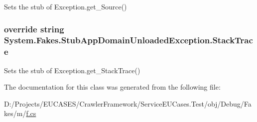 Sets the stub of Exception.\-get\-\_\-\-Source()

\hypertarget{class_system_1_1_fakes_1_1_stub_app_domain_unloaded_exception_a957181d4e271189f788d93b437ef12b4}{
\subsubsection[{Stack\-Trace}]{\setlength{\rightskip}{0pt plus 5cm}override string System.\-Fakes.\-Stub\-App\-Domain\-Unloaded\-Exception.\-Stack\-Trace\hspace{0.3cm}{\ttfamily [get]}}}\label{class_system_1_1_fakes_1_1_stub_app_domain_unloaded_exception_a957181d4e271189f788d93b437ef12b4}


Sets the stub of Exception.\-get\-\_\-\-Stack\-Trace()



The documentation for this class was generated from the following file\-:\begin{DoxyCompactItemize}
\item 
D\-:/\-Projects/\-E\-U\-C\-A\-S\-E\-S/\-Crawler\-Framework/\-Service\-E\-U\-Cases.\-Test/obj/\-Debug/\-Fakes/m/\hyperlink{m_2f_8cs}{f.\-cs}\end{DoxyCompactItemize}
